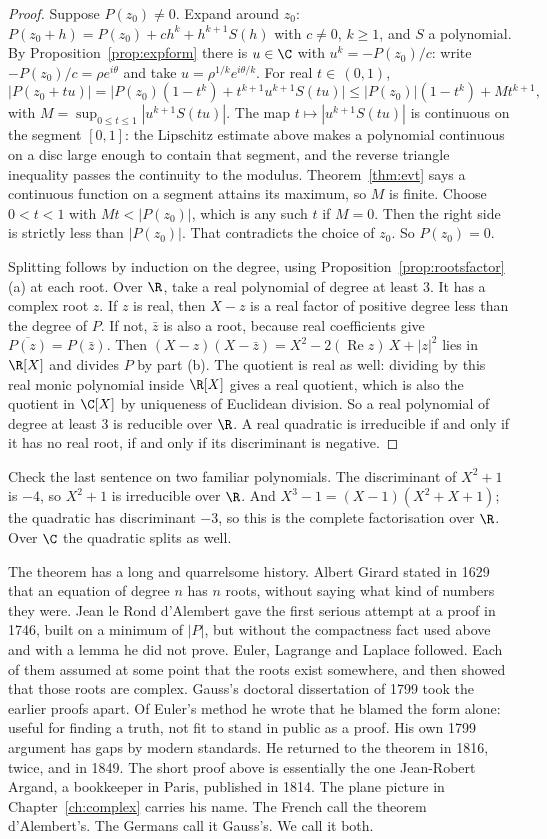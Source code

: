 \begin{proof}
Suppose $P(z_0)\ne0$. Expand around $z_0$: $P(z_0+h)=P(z_0)+ch^k+h^{k+1}S(h)$ with $c\ne0$, $k\ge1$, and $S$ a polynomial. By Proposition~\ref{prop:expform} there is $u\in\C$ with $u^k=-P(z_0)/c$: write $-P(z_0)/c=\rho e^{i\theta}$ and take $u=\rho^{1/k}e^{i\theta/k}$. For real $t\in\,(0,1)$,
\[
|P(z_0+tu)|=\bigl|P(z_0)(1-t^k)+t^{k+1}u^{k+1}S(tu)\bigr|\le|P(z_0)|(1-t^k)+Mt^{k+1},
\]
with $M=\sup_{0\le t\le1}|u^{k+1}S(tu)|$. The map $t\mapsto|u^{k+1}S(tu)|$ is continuous on the segment $[0,1]$: the Lipschitz estimate above makes a polynomial continuous on a disc large enough to contain that segment, and the reverse triangle inequality passes the continuity to the modulus. Theorem~\ref{thm:evt} says a continuous function on a segment attains its maximum, so $M$ is finite. Choose $0<t<1$ with $Mt<|P(z_0)|$, which is any such $t$ if $M=0$. Then the right side is strictly less than $|P(z_0)|$. That contradicts the choice of $z_0$. So $P(z_0)=0$.

Splitting follows by induction on the degree, using Proposition~\ref{prop:rootsfactor}(a) at each root. Over $\R$, take a real polynomial of degree at least $3$. It has a complex root $z$. If $z$ is real, then $X-z$ is a real factor of positive degree less than the degree of $P$. If not, $\bar z$ is also a root, because real coefficients give $\overline{P(z)}=P(\bar z)$. Then $(X-z)(X-\bar z)=X^2-2(\operatorname{Re}z)\,X+|z|^2$ lies in $\R[X]$ and divides $P$ by part (b). The quotient is real as well: dividing by this real monic polynomial inside $\R[X]$ gives a real quotient, which is also the quotient in $\C[X]$ by uniqueness of Euclidean division. So a real polynomial of degree at least $3$ is reducible over $\R$. A real quadratic is irreducible if and only if it has no real root, if and only if its discriminant is negative.
\end{proof}

Check the last sentence on two familiar polynomials. The discriminant of $X^2+1$ is $-4$, so $X^2+1$ is irreducible over $\R$. And $X^3-1=(X-1)(X^2+X+1)$; the quadratic has discriminant $-3$, so this is the complete factorisation over $\R$. Over $\C$ the quadratic splits as well.

The theorem has a long and quarrelsome history. Albert Girard stated in 1629 that an equation of degree $n$ has $n$ roots, without saying what kind of numbers they were. Jean le Rond d'Alembert gave the first serious attempt at a proof in 1746, built on a minimum of $|P|$, but without the compactness fact used above and with a lemma he did not prove. Euler, Lagrange and Laplace followed. Each of them assumed at some point that the roots exist somewhere, and then showed that those roots are complex. Gauss's doctoral dissertation of 1799 took the earlier proofs apart. Of Euler's method he wrote that he blamed the form alone: useful for finding a truth, not fit to stand in public as a proof. His own 1799 argument has gaps by modern standards. He returned to the theorem in 1816, twice, and in 1849. The short proof above is essentially the one Jean-Robert Argand, a bookkeeper in Paris, published in 1814. The plane picture in Chapter~\ref{ch:complex} carries his name. The French call the theorem d'Alembert's. The Germans call it Gauss's. We call it both.

